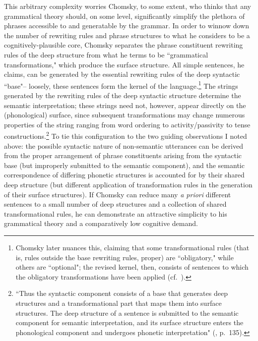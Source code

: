 This arbitrary complexity worries Chomsky, to some extent, who thinks that any grammatical theory should, on some level, significantly simplify the plethora of phrases accessible to and generatable by the grammar.  In order to winnow down the number of rewriting rules and phrase structures to what he considers to be a cognitively-plausible core, Chomsky separates the phrase constituent rewriting rules of the deep structure from what he terms to be ``grammatical transformations," which produce the surface structure.  All simple sentences, he claims, can be generated by the essential rewriting rules of the deep syntactic ``base"-- loosely, these sentences form the kernel of the language.\footnote{Chomsky later nuances this, claiming that some transformational rules (that is, rules outside the base rewriting rules, proper) are ``obligatory," while others are ``optional"; the revised kernel, then, consists of sentences to which the obligatory transformations have been applied (cf.\ \cite{chomsky1965}).}  The strings generated by the rewriting rules of the deep syntactic structure determine the semantic interpretation; these strings need not, however, appear directly on the (phonological) surface, since subsequent transformations may change numerous properties of the string ranging from word ordering to activity/passivity to tense constructions.\footnote{``Thus the syntactic component consists of a base that generates deep structures and a transformational part that maps them into surface structures.  The deep structure of a sentence is submitted to the semantic component for semantic interpretation, and its surface structure enters the phonological component and undergoes phonetic interpretation" (\cite{chomsky1965}, p.\ 135).}  To tie this configuration to the two guiding observations I noted above: the possible syntactic nature of non-semantic utterances can be derived from the proper arrangement of phrase constituents arising from the syntactic base (but improperly submitted to the semantic component), and the semantic correspondence of differing phonetic structures is accounted for by their shared deep structure (but different application of transformation rules in the generation of their surface structures).  If Chomsky can reduce many \emph{a priori} different sentences to a small number of deep structures and a collection of shared transformational rules, he can demonstrate an attractive simplicity to his grammatical theory and a comparatively low cognitive demand.

